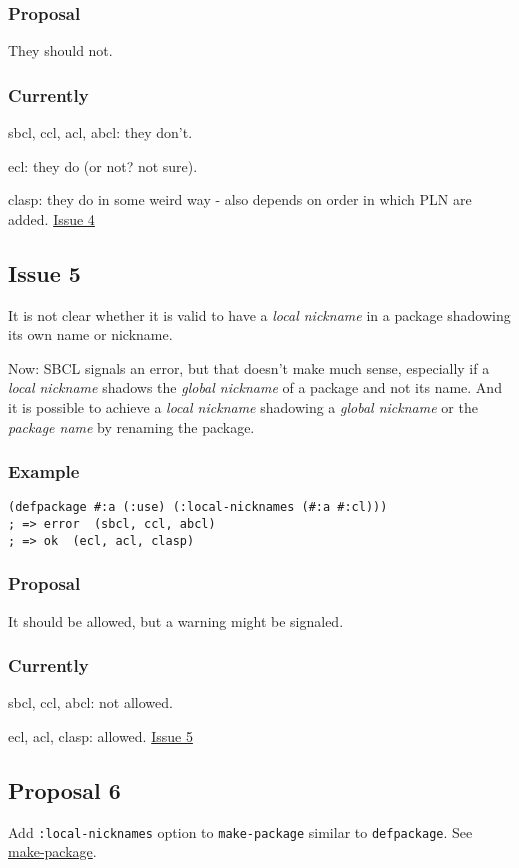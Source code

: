 \documentclass[11pt]{article}
\begin{document}
\subsubsection{Proposal}
\label{sec:org8966aaf}
They should not.
\subsubsection{Currently}
\label{sec:org8621bc6}
sbcl, ccl, acl, abcl: they don't.

ecl: they do (or not? not sure).

 clasp: they do in some weird way - also depends on order in which PLN are
 added.
\href{./issues/4.org}{Issue 4}

\subsection{Issue 5}
\label{sec:org83d89ee}
It is not clear whether it is valid to have a \emph{local nickname} in a package
shadowing its own name or nickname.

Now: SBCL signals an error, but that doesn't make much sense, especially if a
\emph{local nickname} shadows the \emph{global nickname} of a package and not its
name. And it is possible to achieve a \emph{local nickname} shadowing a \emph{global
nickname} or the \emph{package name} by renaming the package.
\subsubsection{Example}
\label{sec:orgb4ce0f8}
\begin{verbatim}
(defpackage #:a (:use) (:local-nicknames (#:a #:cl)))
; => error  (sbcl, ccl, abcl)
; => ok  (ecl, acl, clasp)
\end{verbatim}
\subsubsection{Proposal}
\label{sec:org62b7932}
It should be allowed, but a warning might be signaled.
\subsubsection{Currently}
\label{sec:org72f0e1f}
sbcl, ccl, abcl: not allowed.

 ecl, acl, clasp: allowed.
\href{./issues/5.org}{Issue 5}

\subsection{Proposal 6}
\label{sec:org14774ea}
Add \texttt{:local-nicknames} option to \texttt{make-package} similar to \texttt{defpackage}. See
\hyperref[sec:orga84b400]{make-package}.
\end{document}
